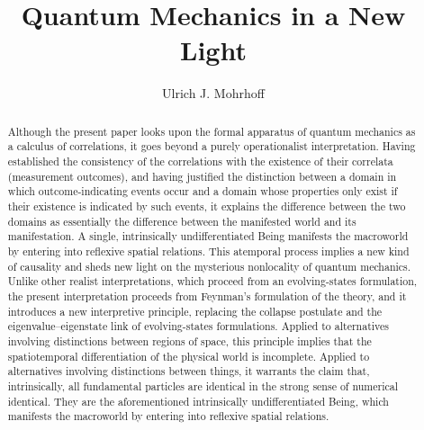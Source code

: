 \title{Quantum Mechanics in a New Light}
\author{Ulrich J. Mohrhoff}
\maketitle
\begin{abstract}
Although the present paper looks upon the formal apparatus of quantum mechanics as a calculus of correlations, it goes beyond a purely operationalist interpretation. Having established the consistency of the correlations with the existence of their correlata (measurement outcomes), and having justified the distinction between a domain in which outcome-indicating events occur and a domain whose properties only exist if their existence is indicated by such events, it explains the difference between the two domains as essentially the difference between the manifested world and its manifestation. A single, intrinsically undifferentiated Being manifests the macroworld by entering into reflexive spatial relations. This atemporal process implies a new kind of causality and sheds new light on the mysterious nonlocality of quantum mechanics. Unlike other realist interpretations, which proceed from an evolving-states formulation, the present interpretation proceeds from Feynman's formulation of the theory, and it introduces a new interpretive principle, replacing the collapse postulate and the eigenvalue--eigenstate link of evolving-states formulations. Applied to alternatives involving distinctions between regions of space, this principle implies that the spatiotemporal differentiation of the physical world is incomplete. Applied to alternatives involving distinctions between things, it warrants the claim that, intrinsically, all fundamental particles are identical in the strong sense of numerical identical. They are the aforementioned intrinsically undifferentiated Being, which manifests the macroworld by entering into reflexive spatial relations.
\end{abstract}

